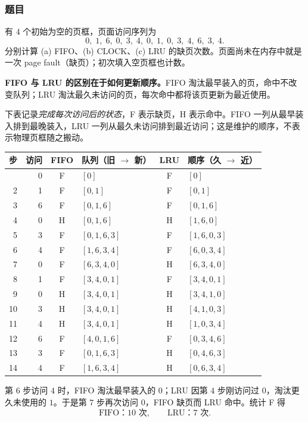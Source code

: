 \subsubsection*{题目}

有 $4$ 个初始为空的页框，页面访问序列为
\[
  0,\;1,\;6,\;0,\;3,\;4,\;0,\;1,\;0,\;3,\;4,\;6,\;3,\;4.
\]
分别计算 (a) FIFO、(b) CLOCK、(c) LRU 的缺页次数。页面尚未在内存中就是一次 page fault（缺页）；初次填入空页框也计数。

\begin{checkedsolution}
\textbf{FIFO 与 LRU 的区别在于如何更新顺序。}FIFO 淘汰最早装入的页，命中不改变队列；LRU 淘汰最久未访问的页，每次命中都将该页更新为最近使用。

下表记录\emph{完成每次访问后的状态}，F 表示缺页，H 表示命中。FIFO 一列从最早装入排到最晚装入，LRU 一列从最久未访问排到最近访问；这是维护的顺序，不表示物理页框随之搬动。

{\small
\begin{longtable}{@{}rrclcl@{}}
\toprule
步 & 访问 & FIFO & 队列（旧 $\to$ 新） & LRU & 顺序（久 $\to$ 近） \\
\midrule
\endhead
\bottomrule
\endfoot
1  & 0 & F & $[0]$       & F & $[0]$ \\
2  & 1 & F & $[0,1]$     & F & $[0,1]$ \\
3  & 6 & F & $[0,1,6]$   & F & $[0,1,6]$ \\
4  & 0 & H & $[0,1,6]$   & H & $[1,6,0]$ \\
5  & 3 & F & $[0,1,6,3]$ & F & $[1,6,0,3]$ \\
6  & 4 & F & $[1,6,3,4]$ & F & $[6,0,3,4]$ \\
7  & 0 & F & $[6,3,4,0]$ & H & $[6,3,4,0]$ \\
8  & 1 & F & $[3,4,0,1]$ & F & $[3,4,0,1]$ \\
9  & 0 & H & $[3,4,0,1]$ & H & $[3,4,1,0]$ \\
10 & 3 & H & $[3,4,0,1]$ & H & $[4,1,0,3]$ \\
11 & 4 & H & $[3,4,0,1]$ & H & $[1,0,3,4]$ \\
12 & 6 & F & $[4,0,1,6]$ & F & $[0,3,4,6]$ \\
13 & 3 & F & $[0,1,6,3]$ & H & $[0,4,6,3]$ \\
14 & 4 & F & $[1,6,3,4]$ & H & $[0,6,3,4]$ \\
\end{longtable}
}
第 $6$ 步访问 $4$ 时，FIFO 淘汰最早装入的 $0$；LRU 因第 $4$ 步刚访问过 $0$，淘汰更久未使用的 $1$。于是第 $7$ 步再次访问 $0$，FIFO 缺页而 LRU 命中。统计 F 得
\[
  \boxed{\text{FIFO：}10\text{ 次}},\qquad
  \boxed{\text{LRU：}7\text{ 次}}.
\]


\end{checkedsolution}
